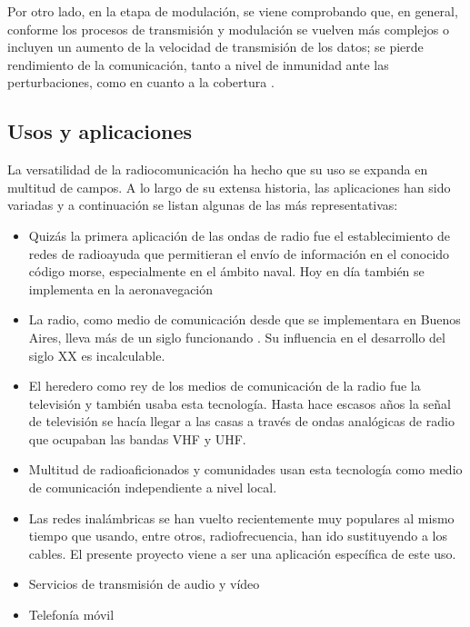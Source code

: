 Por otro lado, en la etapa de modulación, se viene comprobando que, en general, conforme los procesos de transmisión y modulación se vuelven más complejos o incluyen un aumento de la velocidad de transmisión de los datos; se pierde rendimiento de la comunicación, tanto a nivel de inmunidad ante las perturbaciones, como en cuanto a la cobertura \cite{Cisco:2006}.

\subsection{Usos y aplicaciones}

La versatilidad de la radiocomunicación ha hecho que su uso se expanda en multitud de campos. A lo largo de su extensa historia, las aplicaciones han sido variadas y a continuación se listan algunas de las más representativas:

\begin{itemize}
\item Quizás la primera aplicación de las ondas de radio fue el establecimiento de redes de radioayuda que permitieran el envío de información en el conocido código morse, especialmente en el ámbito naval. Hoy en día también se implementa en la aeronavegación
\item La radio, como medio de comunicación desde que se implementara en Buenos Aires, lleva más de un siglo funcionando \cite{Zigiotto:2008}. Su influencia en el desarrollo del siglo XX es incalculable.
\item El heredero como rey de los medios de comunicación de la radio fue la televisión y también usaba esta tecnología. Hasta hace escasos años la señal de televisión se hacía llegar a las casas a través de ondas analógicas de radio que ocupaban las bandas VHF y UHF.
\item Multitud de radioaficionados y comunidades usan esta tecnología como medio de comunicación independiente a nivel local.
\item Las redes inalámbricas se han vuelto recientemente muy populares al mismo tiempo que usando, entre otros, radiofrecuencia, han ido sustituyendo a los cables. El presente proyecto viene a ser una aplicación específica de este uso.
\item Servicios de transmisión de audio y vídeo
\item Telefonía móvil
\end{itemize}